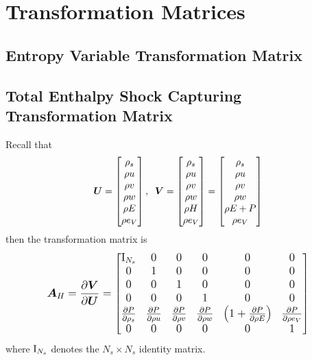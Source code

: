 \section{Transformation Matrices}
\subsection{Entropy Variable Transformation Matrix}

\subsection{Total Enthalpy Shock Capturing Transformation Matrix}
Recall that
\begin{gather*}
    {\boldsymbol{U}} =
    \begin{bmatrix}
      \rho_s \\
      \rho u \\
      \rho v \\
      \rho w \\
      \rho E \\
      \rho  e_V 
    \end{bmatrix},\;\;
    {\boldsymbol{V}} =
    \begin{bmatrix}
      \rho_s \\
      \rho u \\
      \rho v \\
      \rho w \\
      \rho H \\
      \rho  e_V 
    \end{bmatrix} =
    \begin{bmatrix}
      \rho_s \\
      \rho u \\
      \rho v \\
      \rho w \\
      \rho E + P \\
      \rho  e_V 
    \end{bmatrix}
\end{gather*}
then the transformation matrix is
\begin{equation}
  \large
  {\boldsymbol{A}}_H={\frac{\partial{{\boldsymbol{V}}}}{\partial{{\boldsymbol{U}}}}} =
  \begin{bmatrix}
    {\boldsymbol{\text{I}}}_{N_s} & 0 & 0 & 0 & 0 & 0 \\
    0 & 1 & 0 & 0 & 0 & 0 \\
    0 & 0 & 1 & 0 & 0 & 0 \\
    0 & 0 & 0 & 1 & 0 & 0 \\
    {\frac{\partial{P}}{\partial{\rho_s}}} &  {\frac{\partial{P}}{\partial{\rho u}}} &  {\frac{\partial{P}}{\partial{\rho v}}} &  {\frac{\partial{P}}{\partial{\rho w}}} & \left(1 + {\frac{\partial{P}}{\partial{\rho E}}}\right) & {\frac{\partial{P}}{\partial{\rho e_V}}} \\
    0 & 0 & 0 & 0 & 0 & 1
  \end{bmatrix}
\end{equation}
where ${\boldsymbol{\text{I}}}_{N_s}$ denotes the $N_s \times N_s$ identity matrix.


